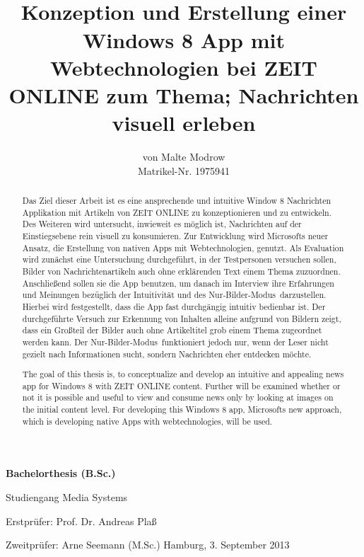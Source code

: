 \documentclass[12pt,a4paper,bibtotoc,abstracton]{scrartcl}
\author{von Malte Modrow \\ Matrikel-Nr. 1975941}
\title{\HRule \\ Konzeption und Erstellung einer Windows 8 App mit Webtechnologien bei ZEIT ONLINE zum Thema; Nachrichten visuell erleben \HRule}
\date{}
\begin{document}
\pagestyle{empty}
\maketitle

\begin{center}		
	\LARGE
	\textbf{Bachelorthesis (B.Sc.)}
	
	\Large 
	Studiengang Media Systems 
	
	\vfill	
	\large
  	Erstprüfer: Prof. Dr. Andreas Plaß
	
	Zweitprüfer: Arne Seemann (M.Sc.)
	\vfill
	Hamburg, 3. September 2013	
\end{center}

\newpage
\parindent0cm
\begin{abstract}
Das Ziel dieser Arbeit ist es eine ansprechende und intuitive Window 8 Nachrichten Applikation mit Artikeln von ZEIT ONLINE zu konzeptionieren und zu entwickeln. Des Weiteren wird untersucht, inwieweit es möglich ist, Nachrichten auf der Einstiegsebene rein visuell zu konsumieren. Zur Entwicklung wird Microsofts neuer Ansatz, die Erstellung von nativen Apps mit Webtechnologien, genutzt. Als Evaluation wird zunächst eine Untersuchung durchgeführt, in der Testpersonen versuchen sollen, Bilder von Nachrichtenartikeln auch ohne erklärenden Text einem Thema zuzuordnen. Anschließend sollen sie die App benutzen, um danach im Interview ihre Erfahrungen und Meinungen bezüglich der Intuitivität und des \glqq Nur-Bilder-Modus\grqq\ darzustellen. Hierbei wird festgestellt, dass die App fast durchgängig intuitiv bedienbar ist. Der durchgeführte Versuch zur Erkennung von Inhalten alleine aufgrund von Bildern zeigt, dass ein Großteil der Bilder auch ohne Artikeltitel grob einem Thema zugeordnet werden kann. Der \glqq Nur-Bilder-Modus\grqq\ funktioniert jedoch nur, wenn der Leser nicht gezielt nach Informationen sucht, sondern Nachrichten eher entdecken möchte.
\end{abstract}

\begin{abstract}
The goal of this thesis is, to conceptualize and develop an intuitive and appealing news app for Windows 8 with ZEIT ONLINE content. Further will be examined whether or not it is possible and useful to view and consume news only by looking at images on the initial content level. For developing this Windows 8 app, Microsofts new approach, which is developing native Apps with webtechnologies, will be used.
\end{abstract}
\end{document}
